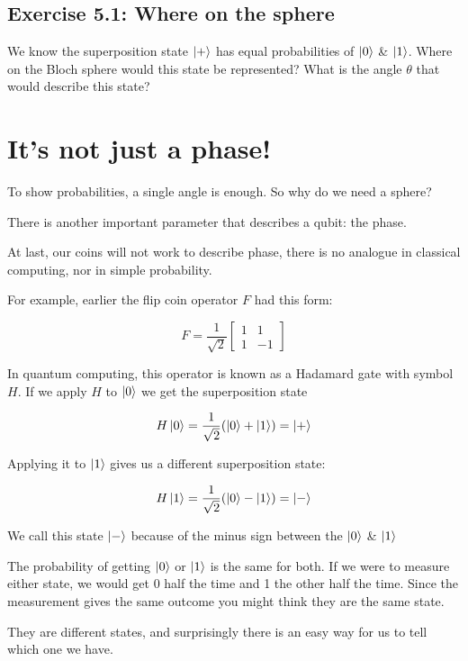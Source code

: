 \documentclass{book}
\begin{document}
\hline
\subsection{Exercise 5.1: Where on the sphere}

We know the superposition state $\ket{+}$ has equal probabilities of $\ket{0}$ \& $\ket{1}$. Where on the Bloch sphere would this state be represented? What is the angle $\theta$ that would describe this state?

\hline

\section{It's not just a phase!} 

To show probabilities, a single angle is enough. So why do we need a sphere? 

There is another important parameter that describes a qubit: the phase. 

At last, our coins will not work to describe phase, there is no analogue in classical computing, nor in simple probability.

For example, earlier the flip coin operator $F$ had this form:

$$
F =  \frac{1}{\sqrt{2}} \begin{bmatrix} 1 & 1 \\ 1 & -1 \end{bmatrix}
$$

In quantum computing, this operator is known as a Hadamard gate with symbol $H$. 
If we apply $H$ to $\ket{0}$ we get the superposition state 

$$
H\ket{0} = \frac{1}{\sqrt{2}} ( \ket{0} + \ket{1}) = \ket{+}
$$

Applying it to $\ket{1}$ gives us a different superposition state: 

$$
H\ket{1} = \frac{1}{\sqrt{2}} ( \ket{0} - \ket{1}) = \ket{-}
$$

We call this state $\ket{-}$ because of the minus sign between the $\ket{0}$ \& $\ket{1}$

The probability of getting $\ket{0}$ or $\ket{1}$ is the same for both. If we were to measure either state, we would get 0 half the time and 1 the other half the time. Since the measurement gives the same outcome you might think they are the same state. 
 
They are different states, and surprisingly there is an easy way for us to tell which one we have. 
\end{document}
